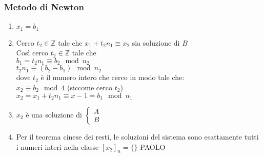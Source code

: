     \subsubsection{Metodo di Newton}
    \begin{enumerate}
        \item $x_1=b_1$
        \item Cerco $t_2\in\mathbb{Z}$ tale che $x_1+t_2n_1\equiv x_2$ sia soluzione di $B$\\
            Così cerco $t_2\in\mathbb{Z}$ tale che \\
            $b_1=t_2n_1\equiv b_2\mod n_2$\\
            $t_2n_1\equiv (b_2-b_1)\mod n_2$\\
            \footnotesize{dove $t_2$ è il numero intero che cerco in modo tale che:\\
            $x_2\equiv b_2\mod 4$ (siccome cerco $t_2$)\\
            $x_2=x_1+t_2n_1\equiv x-1=b_1\mod n_1$}
        \item $x_2$ è una soluzione di $\begin{cases}A\\B\end{cases}$
        \item Per il teorema cinese dei resti, le soluzioni del sistema sono esattamente tutti i numeri interi
            nella classe $[x_2]_n = \{ \}$ {\color{purple} PAOLO} 
    \end{enumerate}
